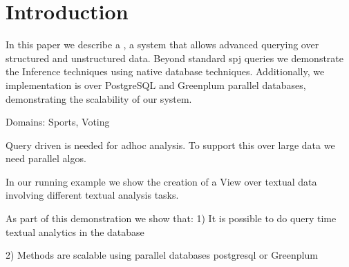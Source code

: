 
\section{Introduction}

In this paper we describe a \system, a system that allows advanced querying
over structured and unstructured data. Beyond standard spj queries we
demonstrate the Inference techniques using native database techniques.
Additionally, we implementation is over PostgreSQL and Greenplum
parallel databases, demonstrating the scalability of our system.

Domains: Sports, Voting

Query driven is needed for adhoc analysis.
To support this over large data we need parallel algos.


In our running example we show the creation of a View over textual
data involving different textual analysis tasks.

As part of this demonstration we show that:
1) It is possible to do query time textual analytics in the database

2) Methods are scalable using parallel databases postgresql or Greenplum



